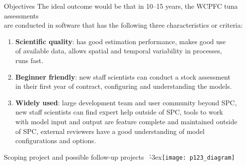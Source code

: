 \documentclass[aspectratio=169,fleqn]{beamer}
\begin{document}
\begin{frame}{Objectives}
  The ideal outcome would be that in 10--15 years, the WCPFC tuna assessments\\
  are conducted in software that has the following three characteristics or
  criteria:\\[1ex]
  \begin{enumerate}
    \item {\bf\blue Scientific quality}: has good estimation performance, makes
    good use\\
    of available data, allows spatial and temporal variability in processes,\\
    runs fast.\\[1.5ex]
    \item {\bf\blue Beginner friendly}: new staff scientists can conduct a stock
    assessment\\
    in their first year of contract, configuring and understanding the
    models.\\[1.5ex]
    \item {\bf\blue Widely used}: large development team and user community
    beyond SPC,\\
    new staff scientists can find expert help outside of SPC, tools
    to work\\
    with model input and output are feature complete and maintained
    outside\\
    of SPC, external reviewers have a good understanding of model\\
    configurations and options.\\[2ex]
  \end{enumerate}
\end{frame}


\begin{frame}{Scoping project and possible follow-up projects}
  \vspace{-1ex}
  ~\h{-3ex}\texttt{[image: p123\_diagram]}
\end{frame}

\end{document}
